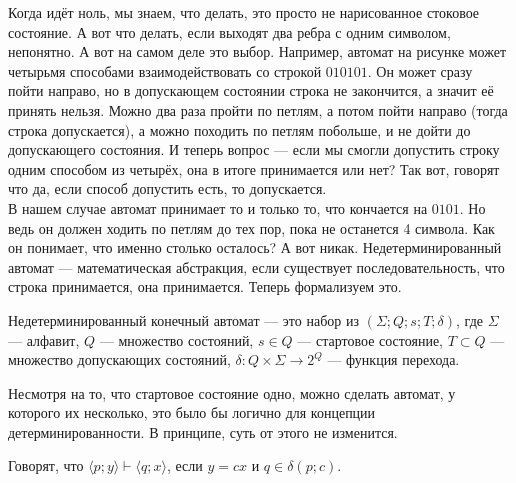 \documentclass{article}
\begin{document}
\begin{itemize}
\begin{Comment}
\begin{figure}[H]
            \end{figure}\noindent
            Когда идёт ноль, мы знаем, что делать, это просто не нарисованное стоковое состояние. А вот что делать, если выходят два ребра с одним символом, непонятно. А вот на самом деле это выбор. Например, автомат на рисунке может четырьмя способами взаимодействовать со строкой $\mathrm{010101}$. Он может сразу пойти направо, но в допускающем состоянии строка не закончится, а значит её принять нельзя. Можно два раза пройти по петлям, а потом пойти направо (тогда строка допускается), а можно походить по петлям побольше, и не дойти до допускающего состояния. И теперь вопрос --- если мы смогли допустить строку одним способом из четырёх, она в итоге принимается или нет? Так вот, говорят что да, если способ допустить есть, то допускается.\\
            В нашем случае автомат принимает то и только то, что кончается на $\mathrm{0101}$. Но ведь он должен ходить по петлям до тех пор, пока не останется 4 символа. Как он понимает, что именно столько осталось? А вот никак. Недетерминированный автомат --- математическая абстракция, если существует последовательность, что строка принимается, она принимается. Теперь формализуем это.
        \end{Comment}
        \dfn Недетерминированный конечный автомат --- это набор из $(\Sigma;Q;s;T;\delta)$, где $\Sigma$ --- алфавит, $Q$ --- множество состояний, $s\in Q$ --- стартовое состояние, $T\subset Q$ --- множество допускающих состояний, $\delta\colon Q\times\Sigma\to2^Q$ --- функция перехода.
        \begin{Comment}
            Несмотря на то, что стартовое состояние одно, можно сделать автомат, у которого их несколько, это было бы логично для концепции детерминированности. В принципе, суть от этого не изменится.
        \end{Comment}
        \dfn Говорят, что $\langle p;y\rangle\vdash\langle q;x\rangle$, если $y=cx$ и $q\in\delta(p;c)$.

\end{itemize}
\end{document}

